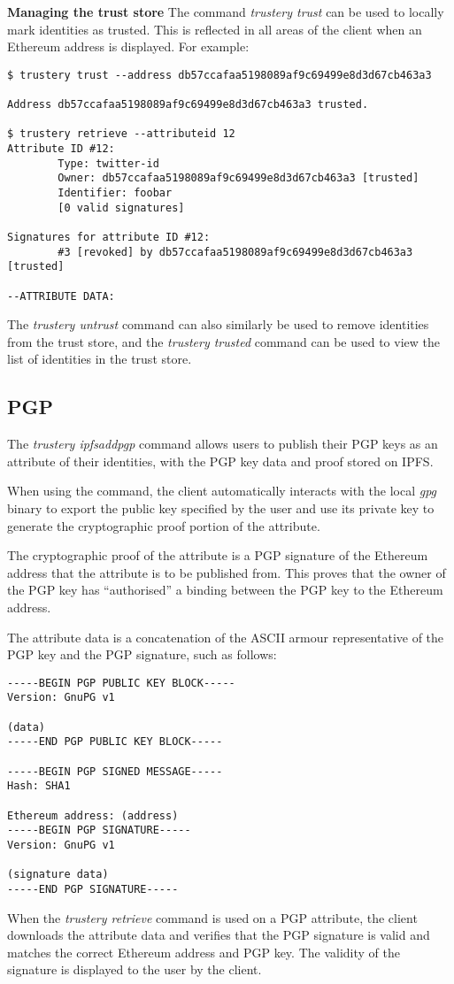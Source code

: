\documentclass[12pt]{report}
\begin{document}
	\bigskip
	\noindent \textbf{Managing the trust store}\newline
	The command \textit{trustery trust} can be used to locally mark identities as trusted. This is reflected in all areas of the client when an Ethereum address is displayed. For example:
	\begin{lstlisting}
$ trustery trust --address db57ccafaa5198089af9c69499e8d3d67cb463a3

Address db57ccafaa5198089af9c69499e8d3d67cb463a3 trusted.

$ trustery retrieve --attributeid 12
Attribute ID #12:
        Type: twitter-id
        Owner: db57ccafaa5198089af9c69499e8d3d67cb463a3 [trusted]
        Identifier: foobar
        [0 valid signatures]

Signatures for attribute ID #12:
        #3 [revoked] by db57ccafaa5198089af9c69499e8d3d67cb463a3 [trusted]

--ATTRIBUTE DATA:

	\end{lstlisting}
	The \textit{trustery untrust} command can also similarly be used to remove identities from the trust store, and the \textit{trustery trusted} command can be used to view the list of identities in the trust store.
	
	\subsection{PGP}
	The \textit{trustery ipfsaddpgp} command allows users to publish their PGP keys as an attribute of their identities, with the PGP key data and proof stored on IPFS.
	
	When using the command, the client automatically interacts with the local \textit{gpg} binary to export the public key specified by the user and use its private key to generate the cryptographic proof portion of the attribute.
	
	The cryptographic proof of the attribute is a PGP signature of the Ethereum address that the attribute is to be published from. This proves that the owner of the PGP key has ``authorised'' a binding between the PGP key to the Ethereum address.
	
	The attribute data is a concatenation of the ASCII armour representative of the PGP key and the PGP signature, such as follows:
	\begin{lstlisting}
-----BEGIN PGP PUBLIC KEY BLOCK-----
Version: GnuPG v1

(data)
-----END PGP PUBLIC KEY BLOCK-----

-----BEGIN PGP SIGNED MESSAGE-----
Hash: SHA1

Ethereum address: (address)
-----BEGIN PGP SIGNATURE-----
Version: GnuPG v1

(signature data)
-----END PGP SIGNATURE-----
	\end{lstlisting}
	When the \textit{trustery retrieve} command is used on a PGP attribute, the client downloads the attribute data and verifies that the PGP signature is valid and matches the correct Ethereum address and PGP key. The validity of the signature is displayed to the user by the client.
	
\end{document}
